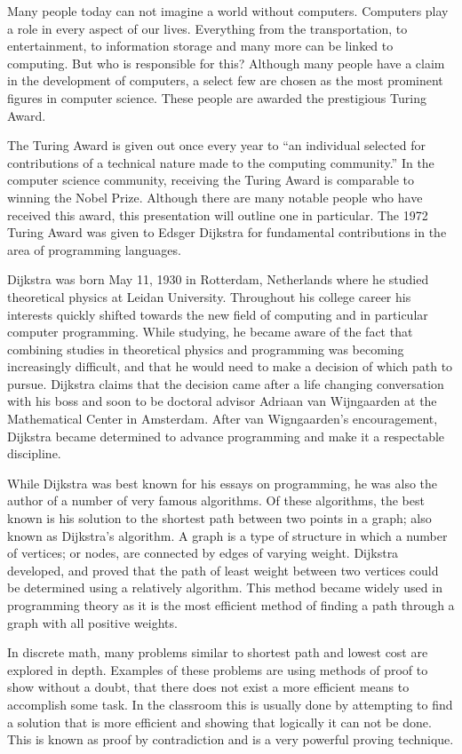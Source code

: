   Many people today can not imagine a world without computers.  Computers play a role in every  aspect of our lives.  Everything from the transportation, to entertainment, to information storage and many more can be linked to computing. But who is responsible for this?  Although many people have a claim in the development of computers, a select few are chosen as the most prominent figures in computer science.  These people are awarded the prestigious Turing Award.

    The Turing Award is given out once every year to “an individual selected for contributions of a technical nature made to the computing community.”  In the computer science community, receiving the Turing Award is comparable to winning the Nobel Prize.  Although there are many notable people who have received this award, this presentation will outline one in particular.  The 1972 Turing Award was given to Edsger Dijkstra for fundamental contributions in the area of programming languages.

      Dijkstra was born May 11, 1930 in Rotterdam, Netherlands where he studied theoretical physics at Leidan University.  Throughout his college career his interests quickly shifted towards the new field of computing and in particular computer programming.  While studying, he became aware of the fact that combining studies in theoretical physics and programming was becoming increasingly difficult, and that he would need to make a decision of which path to pursue. Dijkstra claims that the decision came after a life changing conversation with his boss and soon to be doctoral advisor Adriaan van Wijngaarden at the Mathematical Center in Amsterdam.  After van Wigngaarden's encouragement, Dijkstra became determined to advance programming and make it a respectable discipline.

        While Dijkstra was best known for his essays on programming, he was also the author of a number of very famous algorithms.  Of these algorithms, the best known is his solution to the shortest path between two points in a graph; also known as Dijkstra's algorithm.  A graph is a type of structure in which a number of vertices; or nodes, are connected by edges of varying weight.  Dijkstra developed, and proved that the path of least weight between two vertices could be determined using a relatively algorithm. This method became widely used in programming theory as it is the most efficient method of finding a path through a graph with all positive weights.

          In discrete math, many problems similar to shortest path and lowest cost are explored in depth.  Examples of these problems are using methods of proof to show without a doubt, that there does not exist a more efficient means to accomplish some task.  In the classroom this is usually done by attempting to find a solution that is more efficient and showing that logically it can not be done.  This is known as proof by contradiction and is a very powerful proving technique.

